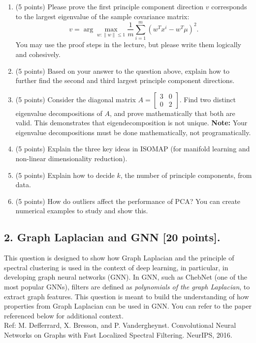 \documentclass[twoside,10pt]{article}
\begin{document}
\begin{enumerate}

\item (5 points) Please prove the first principle component direction $v$ corresponds to the largest eigenvalue of the sample covariance matrix:
\[
v = \arg\max_{w: \|w\|\leq 1} \frac 1 m \sum_{i=1}^m (w^T x^i - w^T \mu)^2.
\]
You may use the proof steps in the lecture, but please write them logically and cohesively.

\item (5 points) Based on your answer to the question above, explain how to further find the second and third largest principle component directions.

\item (5 points) 
Consider the diagonal matrix \( A = \begin{bmatrix} 3 & 0 \\ 0 & 2 \end{bmatrix} \).  
Find two distinct eigenvalue decompositions of \( A \), and prove mathematically that both are valid. This demonstrates that eigendecomposition is not unique. \textbf{Note:} Your eigenvalue decompositions must be done mathematically, not programatically.

\item (5 points) Explain the three key ideas in ISOMAP (for manifold learning and non-linear dimensionality reduction). 

\item (5 points) Explain how to decide $k$, the number of principle components, from data. 

\item (5 points) How do outliers affect the performance of PCA? You can create numerical examples to study and show this.

\end{enumerate}


\clearpage

\subsection*{2. Graph Laplacian and GNN [20 points].}

This question is designed to show how Graph Laplacian and the principle of spectral clustering is used in the context of deep learning, in particular, in developing graph neural networks (GNN). In GNN, such as ChebNet (one of the most popular GNNs), filters are defined as \emph{polynomials of the graph Laplacian}, to extract graph features. This question is meant to build the understanding of how properties from Graph Laplacian can be used in GNN. You can refer to the paper referenced below for additional context. \\
Ref: M. Defferrard, X. Bresson, and P. Vandergheynst. Convolutional Neural Networks on Graphs with Fast Localized Spectral Filtering. NeurIPS, 2016.\\
\end{document}
